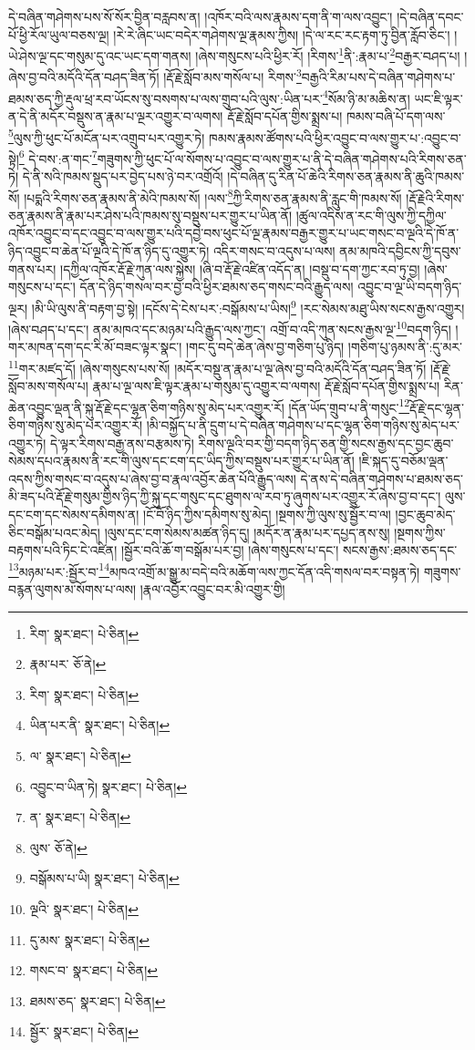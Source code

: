 དེ་བཞིན་གཤེགས་པས་སོ་སོར་བྱིན་བརླབས་ན། །འཁོར་བའི་ལས་རྣམས་དག་ནི་ག་ལས་འབྱུང་། །དེ་བཞིན་དབང་པོ་ཕྱི་རོལ་ཡུལ་བཅས་ལྔ། །རེ་རེ་ཞིང་ཡང་བདེར་གཤེགས་ལྔ་རྣམས་ཀྱིས། །དེ་ལ་རང་རང་རྟག་ཏུ་བྱིན་རློབ་ཅིང་། །ཡེ་ཤེས་ལྔ་དང་གསུམ་དུ་འང་ཡང་དག་གནས། །ཞེས་གསུངས་པའི་ཕྱིར་རོ། །རིགས་\footnote{རིག་  སྣར་ཐང་།  པེ་ཅིན། }ནི་:རྣམ་པ་\footnote{རྣམ་པར་  ཅོ་ནེ། }བརྒྱར་བཤད་པ། །ཞེས་བྱ་བའི་མདོའི་དོན་བཤད་ཟིན་ཏོ། །རྡོ་རྗེ་སློབ་མས་གསོལ་པ། རིགས་\footnote{རིག་  སྣར་ཐང་།  པེ་ཅིན། }བརྒྱའི་རིམ་པས་དེ་བཞིན་གཤེགས་པ་ཐམས་ཅད་ཀྱི་རྡུལ་ཕྲ་རབ་ཡོངས་སུ་བསགས་པ་ལས་གྲུབ་པའི་ལུས་:ཡིན་པར་\footnote{ཡིན་པར་ནི་  སྣར་ཐང་།  པེ་ཅིན། }སོམ་ཉི་མ་མཆིས་ན། ཡང་ཇི་ལྟར་ན་དེ་ནི་མདོར་བསྡུས་ན་རྣམ་པ་ལྔར་འགྱུར་བ་ལགས། རྡོ་རྗེ་སློབ་དཔོན་གྱིས་སྨྲས་པ། ཁམས་བཞི་པོ་དག་ལས་\footnote{ལ་  སྣར་ཐང་།  པེ་ཅིན། }ལུས་ཀྱི་ཕུང་པོ་མངོན་པར་འགྲུབ་པར་འགྱུར་ཏེ། ཁམས་རྣམས་ཚོགས་པའི་ཕྱིར་འབྱུང་བ་ལས་གྱུར་པ་:འབྱུང་བ་སྟེ།\footnote{འབྱུང་བ་ཡིན་ཏེ།  སྣར་ཐང་།  པེ་ཅིན། } དེ་བས་:ན་གང་\footnote{ན་  སྣར་ཐང་།  པེ་ཅིན། }གཟུགས་ཀྱི་ཕུང་པོ་ལ་སོགས་པ་འབྱུང་བ་ལས་གྱུར་པ་ནི་དེ་བཞིན་གཤེགས་པའི་རིགས་ཅན་ཏེ། དེ་ནི་སའི་ཁམས་སྡུད་པར་བྱེད་པས་ཉེ་བར་འགྲོའོ། །དེ་བཞིན་དུ་རིན་པོ་ཆེའི་རིགས་ཅན་རྣམས་ནི་ཆུའི་ཁམས་སོ། །པདྨའི་རིགས་ཅན་རྣམས་ནི་མེའི་ཁམས་སོ། །ལས་\footnote{ལུས་  ཅོ་ནེ། }ཀྱི་རིགས་ཅན་རྣམས་ནི་རླུང་གི་ཁམས་སོ། །རྡོ་རྗེའི་རིགས་ཅན་རྣམས་ནི་རྣམ་པར་ཤེས་པའི་ཁམས་སུ་བསྡུས་པར་གྱུར་པ་ཡིན་ནོ། །ཚུལ་འདིས་ན་རང་གི་ལུས་ཀྱི་དཀྱིལ་འཁོར་འབྱུང་བ་དང་འབྱུང་བ་ལས་གྱུར་པའི་དབྱེ་བས་ཕུང་པོ་ལྔ་རྣམས་བརྒྱར་གྱུར་པ་ཡང་གསང་བ་ལྔའི་དེ་ཁོ་ན་ཉིད་འབྱུང་བ་ཆེན་པོ་ལྔའི་དེ་ཁོ་ན་ཉིད་དུ་འགྱུར་ཏེ། འདིར་གསང་བ་འདུས་པ་ལས། ནམ་མཁའི་དབྱིངས་ཀྱི་དབུས་གནས་པར། །དཀྱིལ་འཁོར་རྡོ་རྗེ་ཀུན་ལས་སྐྱེས། །ཞི་བ་རྡོ་རྗེ་འཛིན་འདོད་ན། །བསྡུ་བ་དག་ཀྱང་རབ་ཏུ་བྱ། །ཞེས་གསུངས་པ་དང་། དོན་དེ་ཉིད་གསལ་བར་བྱ་བའི་ཕྱིར་ཐམས་ཅད་གསང་བའི་རྒྱུད་ལས། འབྱུང་བ་ལྔ་ཡི་བདག་ཉིད་ལྔར། །མི་ཡི་ལུས་ནི་བརྟག་བྱ་སྟེ། །དངོས་དེ་ངེས་པར་:བསྒོམས་པ་ཡིས།\footnote{བསྒོམས་པ་ཡི།  སྣར་ཐང་།  པེ་ཅིན། } །རང་སེམས་མཐུ་ཡིས་སངས་རྒྱས་འགྱུར། །ཞེས་བཤད་པ་དང་། ནམ་མཁའ་དང་མཉམ་པའི་རྒྱུད་ལས་ཀྱང་། འགྲོ་བ་འདི་ཀུན་སངས་རྒྱས་ལྔ་\footnote{ལྔའི་  སྣར་ཐང་།  པེ་ཅིན། }བདག་ཉིད། །གར་མཁན་དག་དང་རི་མོ་བཟང་ལྟར་སྣང་། །གང་དུ་བདེ་ཆེན་ཞེས་བྱ་གཅིག་པུ་ཉིད། །གཅིག་པུ་ཉམས་ནི་:དུ་མར་\footnote{དུ་མས་  སྣར་ཐང་།  པེ་ཅིན། }གར་མཛད་དོ། །ཞེས་གསུངས་པས་སོ། །མདོར་བསྡུ་ན་རྣམ་པ་ལྔ་ཞེས་བྱ་བའི་མདོའི་དོན་བཤད་ཟིན་ཏོ། །རྡོ་རྗེ་སློབ་མས་གསོལ་པ། རྣམ་པ་ལྔ་ལས་ཇི་ལྟར་རྣམ་པ་གསུམ་དུ་འགྱུར་བ་ལགས། རྡོ་རྗེ་སློབ་དཔོན་གྱིས་སྨྲས་པ། རིན་ཆེན་འབྱུང་ལྡན་ནི་སྐུ་རྡོ་རྗེ་དང་ལྷན་ཅིག་གཉིས་སུ་མེད་པར་འགྱུར་རོ། །དོན་ཡོད་གྲུབ་པ་ནི་གསུང་\footnote{གསང་བ་  སྣར་ཐང་།  པེ་ཅིན། }རྡོ་རྗེ་དང་ལྷན་ཅིག་གཉིས་སུ་མེད་པར་འགྱུར་རོ། །མི་བསྐྱོད་པ་ནི་དྲུག་པ་དེ་བཞིན་གཤེགས་པ་དང་ལྷན་ཅིག་གཉིས་སུ་མེད་པར་འགྱུར་ཏེ། དེ་ལྟར་རིགས་བརྒྱ་ནས་བརྩམས་ཏེ། རིགས་ལྔའི་བར་གྱི་བདག་ཉིད་ཅན་གྱི་སངས་རྒྱས་དང་བྱང་ཆུབ་སེམས་དཔའ་རྣམས་ནི་རང་གི་ལུས་དང་ངག་དང་ཡིད་ཀྱིས་བསྡུས་པར་གྱུར་པ་ཡིན་ནོ། །ཇི་སྐད་དུ་བཅོམ་ལྡན་འདས་ཀྱིས་གསང་བ་འདུས་པ་ཞེས་བྱ་བ་རྣལ་འབྱོར་ཆེན་པོའི་རྒྱུད་ལས། དེ་ནས་དེ་བཞིན་གཤེགས་པ་ཐམས་ཅད་མི་ཟད་པའི་རྡོ་རྗེ་གསུམ་གྱིས་ཉིད་ཀྱི་སྐུ་དང་གསུང་དང་ཐུགས་ལ་རབ་ཏུ་ཞུགས་པར་འགྱུར་རོ་ཞེས་བྱ་བ་དང་། ལུས་དང་ངག་དང་སེམས་དམིགས་ན། །ངོ་བོ་ཉིད་ཀྱིས་དམིགས་སུ་མེད། །སྔགས་ཀྱི་ལུས་སུ་སྦྱོར་བ་ལ། །བྱང་ཆུབ་མེད་ཅིང་བསྒོམ་པའང་མེད། །ལུས་དང་ངག་སེམས་མཚན་ཉིད་དུ། །མདོར་ན་རྣམ་པར་དཔྱད་ནས་སུ། །སྔགས་ཀྱིས་བརྟགས་པའི་ཏིང་ངེ་འཛིན། །སྦྱོར་བའི་ཆོ་ག་བསྒོམ་པར་བྱ། །ཞེས་གསུངས་པ་དང་། སངས་རྒྱས་:ཐམས་ཅད་དང་\footnote{ཐམས་ཅད་  སྣར་ཐང་།  པེ་ཅིན། }མཉམ་པར་:སྦྱོར་བ་\footnote{སྦྱོར་  སྣར་ཐང་།  པེ་ཅིན། }མཁའ་འགྲོ་མ་སྒྱུ་མ་བདེ་བའི་མཆོག་ལས་ཀྱང་དོན་འདི་གསལ་བར་བསྟན་ཏེ། གཟུགས་བརྙན་ལུགས་མ་སོགས་པ་ལས། །རྣལ་འབྱོར་འབྱུང་བར་མི་འགྱུར་གྱི། 